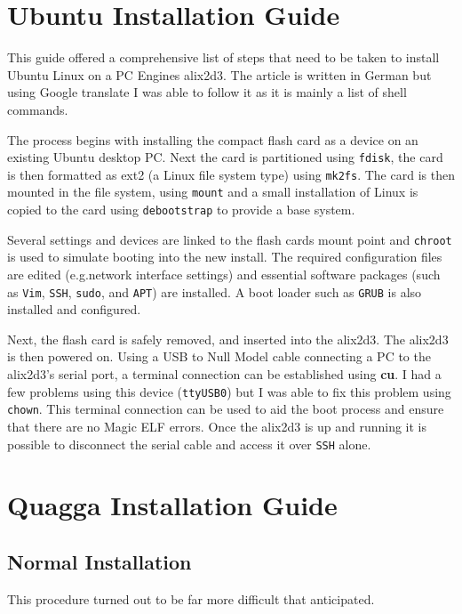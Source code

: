 \section{Ubuntu Installation Guide}

 This guide\cite{germanGuide} offered a comprehensive list of steps that need to
 be taken to install Ubuntu Linux on a PC Engines alix2d3\cite{alix2d3}.  The article is
 written in German but using Google translate I was able to follow it as it is
 mainly a list of shell commands.

 The process begins with installing the compact flash card as a device on an
 existing Ubuntu desktop PC\@. Next the card is partitioned using \texttt{fdisk},
 the card is then formatted as ext2 (a Linux file system type) using
 \texttt{mk2fs}. The card is then mounted in the file system, using
 \texttt{mount} and a small installation of Linux is copied to the card using
 \texttt{debootstrap} to provide a base system.

 Several settings and devices are linked to the flash cards mount point and
 \texttt{chroot} is used to simulate booting into the new install. The required
 configuration files are edited (e.g.\@ network interface settings) and essential
 software packages (such as \texttt{Vim}, \texttt{SSH}, \texttt{sudo}, and
 \texttt{APT}) are installed. A boot loader such as \texttt{GRUB} is also
 installed and configured.

 Next, the flash card is safely removed, and  inserted into the alix2d3. The
 alix2d3 is then powered on. Using a USB to Null Model cable connecting a PC to
 the alix2d3's serial port, a terminal connection can be established using {\bf
 cu}. I had a few problems using this device (\texttt{ttyUSB0}) but I was able to
 fix this problem using \texttt{chown}. This terminal connection can be used to
 aid the boot process and ensure that there are no Magic ELF errors. Once the
 alix2d3 is up and running it is possible to disconnect the serial cable and
 access it over \texttt{SSH} alone.

 \section{Quagga Installation Guide}

 \subsection{Normal Installation}
This procedure turned out to be far more difficult that anticipated.


